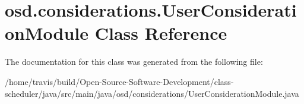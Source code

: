 \hypertarget{classosd_1_1considerations_1_1_user_consideration_module}{\section{osd.\-considerations.\-User\-Consideration\-Module Class Reference}
\label{classosd_1_1considerations_1_1_user_consideration_module}
}


The documentation for this class was generated from the following file\-:\begin{DoxyCompactItemize}
\item 
/home/travis/build/\-Open-\/\-Source-\/\-Software-\/\-Development/class-\/scheduler/java/src/main/java/osd/considerations/User\-Consideration\-Module.\-java\end{DoxyCompactItemize}
